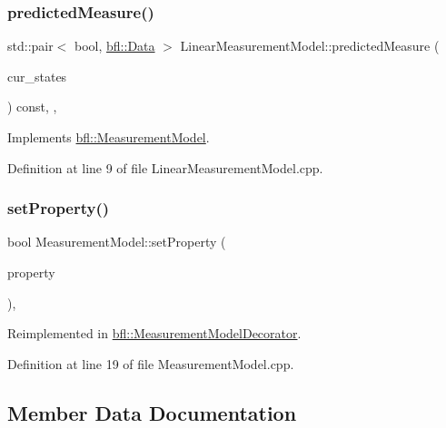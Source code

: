 \subsubsection{\texorpdfstring{predicted\+Measure()}{predictedMeasure()}}
{\footnotesize\ttfamily std\+::pair$<$ bool, \mbox{\hyperlink{namespacebfl_af6b103c6821db1b54452f776fdd9dd02}{bfl\+::\+Data}} $>$ Linear\+Measurement\+Model\+::predicted\+Measure (\begin{DoxyParamCaption}\item[{const Eigen\+::\+Ref$<$ const Eigen\+::\+Matrix\+Xd $>$ \&}]{cur\+\_\+states }\end{DoxyParamCaption}) const\hspace{0.3cm}{\ttfamily [override]}, {\ttfamily [virtual]}, {\ttfamily [inherited]}}



Implements \mbox{\hyperlink{classbfl_1_1MeasurementModel_a8fc8798aa2db48f428d4ce59b33b5307}{bfl\+::\+Measurement\+Model}}.



Definition at line 9 of file Linear\+Measurement\+Model.\+cpp.

\mbox{\label{classbfl_1_1MeasurementModel_af97e18b52d1a3f365dd5982b8cc4aff7}} 
\subsubsection{\texorpdfstring{set\+Property()}{setProperty()}}
{\footnotesize\ttfamily bool Measurement\+Model\+::set\+Property (\begin{DoxyParamCaption}\item[{const std\+::string \&}]{property }\end{DoxyParamCaption})\hspace{0.3cm}{\ttfamily [virtual]}, {\ttfamily [inherited]}}



Reimplemented in \mbox{\hyperlink{classbfl_1_1MeasurementModelDecorator_a531a891152d7bf83e56370664d54f42f}{bfl\+::\+Measurement\+Model\+Decorator}}.



Definition at line 19 of file Measurement\+Model.\+cpp.



\subsection{Member Data Documentation}
\mbox{\label{classbfl_1_1LinearModel_a3a12555172d2f2fa284ec47bb4799559}} 

